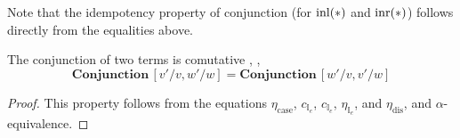  
  Note that the idempotency property of conjunction (for $\mathrm{inl}(*)$ and $\mathrm{inr}(*)$) follows directly from the equalities above.


\begin{lemma} \label{lem:comm}
  The conjunction of two terms is comutative , \ie,
 $$ \textbf{Conjunction} \, [v'/v,w'/w ] = \textbf{Conjunction} \, [w'/v,v'/w ]  $$ 
\end{lemma}




\begin{proof}
  This property follows from the equations $\eta_{\text{case}}$,  $c_{\mathbb{I}_{e}}$, $c_{\mathbb{I}_{e}}$, $\eta_{\mathbb{I}_{e}}$, and $\eta_{\text{dis}}$, and $\alpha$-equivalence.
  

\end{proof}
